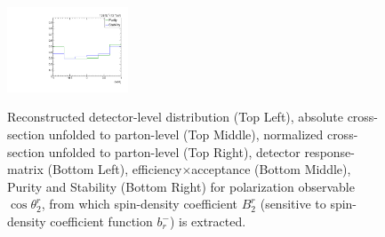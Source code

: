 \begin{figure}[htb]
\begin{center}
 \includegraphics[width=0.32\textwidth]{fig_fullRun2UL/unfolding/combined/PurStab_b2r.pdf} \\
\caption{Reconstructed detector-level distribution (Top Left), absolute cross-section unfolded to parton-level (Top Middle), normalized cross-section unfolded to parton-level (Top Right), detector response-matrix (Bottom Left), efficiency$\times$acceptance (Bottom Middle), Purity and Stability (Bottom Right) for polarization observable $\cos\theta_{2}^{r}$, from which spin-density coefficient $B_{2}^{r}$ (sensitive to spin-density coefficient function $b_r^{-}$) is extracted.}
\label{fig:b2r}
\end{center}
\end{figure}
\clearpage

